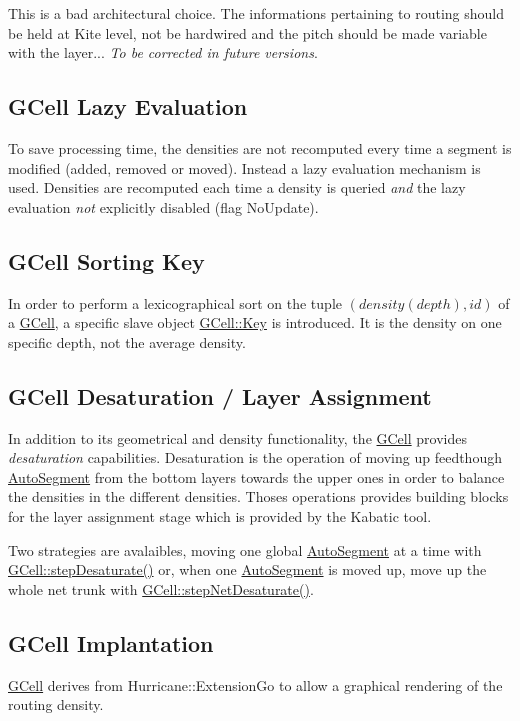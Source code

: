 This is a bad architectural choice. The informations pertaining to routing should be held at Kite level, not be hardwired and the pitch should be made variable with the layer... {\itshape To be corrected in future versions}.\hypertarget{classKatabatic_1_1GCell_secGCellLazyEvaluation}{}\subsection{G\+Cell Lazy Evaluation}\label{classKatabatic_1_1GCell_secGCellLazyEvaluation}
To save processing time, the densities are not recomputed every time a segment is modified (added, removed or moved). Instead a lazy evaluation mechanism is used. Densities are recomputed each time a density is queried {\itshape and} the lazy evaluation {\itshape not} explicitly disabled (flag No\+Update).\hypertarget{classKatabatic_1_1GCell_secGCellSortingKey}{}\subsection{G\+Cell Sorting Key}\label{classKatabatic_1_1GCell_secGCellSortingKey}
In order to perform a lexicographical sort on the tuple $(density(depth),id)$ of a \hyperlink{classKatabatic_1_1GCell}{G\+Cell}, a specific slave object \hyperlink{classKatabatic_1_1GCell_1_1Key}{G\+Cell\+::\+Key} is introduced. It is the density on one specific depth, not the average density.\hypertarget{classKatabatic_1_1GCell_secGCellDesaturation}{}\subsection{G\+Cell Desaturation / Layer Assignment}\label{classKatabatic_1_1GCell_secGCellDesaturation}
In addition to it\textquotesingle{}s geometrical and density functionality, the \hyperlink{classKatabatic_1_1GCell}{G\+Cell} provides {\itshape desaturation} capabilities. Desaturation is the operation of moving up feedthough \hyperlink{classKatabatic_1_1AutoSegment}{Auto\+Segment} from the bottom layers towards the upper ones in order to balance the densities in the different densities. Thoses operations provides building blocks for the layer assignment stage which is provided by the Kabatic tool.

Two strategies are avalaibles, moving one global \hyperlink{classKatabatic_1_1AutoSegment}{Auto\+Segment} at a time with \hyperlink{classKatabatic_1_1GCell_a5ae4d250ebecf59aa98fb068d848be14}{G\+Cell\+::step\+Desaturate()} or, when one \hyperlink{classKatabatic_1_1AutoSegment}{Auto\+Segment} is moved up, move up the whole net trunk with \hyperlink{classKatabatic_1_1GCell_abe4cf4a81bb78e9b479992336a999a07}{G\+Cell\+::step\+Net\+Desaturate()}.\hypertarget{classKatabatic_1_1GCell_secGCellImplantation}{}\subsection{G\+Cell Implantation}\label{classKatabatic_1_1GCell_secGCellImplantation}
\hyperlink{classKatabatic_1_1GCell}{G\+Cell} derives from Hurricane\+::\+Extension\+Go to allow a graphical rendering of the routing density. 

